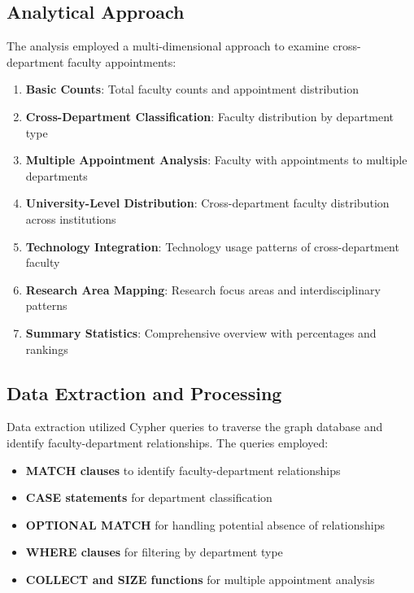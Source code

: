\documentclass[12pt]{article}
\begin{document}
\subsection{Analytical Approach}

The analysis employed a multi-dimensional approach to examine cross-department faculty appointments:

\begin{enumerate}
    \item \textbf{Basic Counts}: Total faculty counts and appointment distribution
    \item \textbf{Cross-Department Classification}: Faculty distribution by department type
    \item \textbf{Multiple Appointment Analysis}: Faculty with appointments to multiple departments
    \item \textbf{University-Level Distribution}: Cross-department faculty distribution across institutions
    \item \textbf{Technology Integration}: Technology usage patterns of cross-department faculty
    \item \textbf{Research Area Mapping}: Research focus areas and interdisciplinary patterns
    \item \textbf{Summary Statistics}: Comprehensive overview with percentages and rankings
\end{enumerate}

\subsection{Data Extraction and Processing}

Data extraction utilized Cypher queries to traverse the graph database and identify faculty-department relationships. The queries employed:

\begin{itemize}
    \item \textbf{MATCH clauses} to identify faculty-department relationships
    \item \textbf{CASE statements} for department classification
    \item \textbf{OPTIONAL MATCH} for handling potential absence of relationships
    \item \textbf{WHERE clauses} for filtering by department type
    \item \textbf{COLLECT and SIZE functions} for multiple appointment analysis
\end{itemize}
\end{document}
